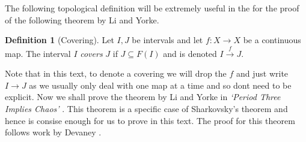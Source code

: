 \documentclass[11pt,a4paper,oneside]{memoir}
\theoremstyle{plain}
\theoremstyle{definition}
\newtheorem{defn}[thm]{Definition}
\begin{document}
The following topological definition will be extremely useful in the for the proof of the following theorem by Li and Yorke.

\begin{defn}[Covering] \label{defn:covering}
    Let $I, J$ be intervals and let $f: X \to X$ be a continuous map. The interval $I$ \emph{covers} $J$ if $J \subseteq F(I)$ and is denoted $I \xrightarrow{f} J$.
\end{defn}

Note that in this text, to denote a covering we will drop the $f$ and just write $I \to J$ as we usually only deal with one map at a time and so dont need to be explicit. Now we shall prove the theorem by Li and Yorke in \emph{`Period Three Implies Chaos'} \cite{li-yorke}. This theorem is a specific case of Sharkovsky's theorem and hence is consise enough for us to prove in this text. The proof for this theorem follows work by Devaney \cite[Chapter 1.10]{devaney}.
\end{document}
